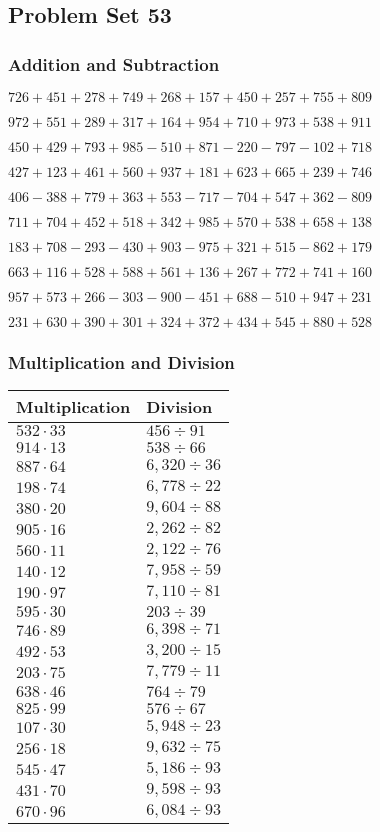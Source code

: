 \hypertarget{problem-set-53-1}{%
\subsection{Problem Set 53}\label{problem-set-53-1}}

\hypertarget{addition-and-subtraction-153}{%
\subsubsection{Addition and
Subtraction}\label{addition-and-subtraction-153}}

\(726 + 451 + 278 + 749 + 268 + 157 + 450 + 257 + 755 + 809\)

\(972 + 551 + 289 + 317 + 164 + 954 + 710 + 973 + 538 + 911\)

\(450 + 429 + 793 + 985 - 510 + 871 - 220 - 797 - 102 + 718\)

\(427 + 123 + 461 + 560 + 937 + 181 + 623 + 665 + 239 + 746\)

\(406 - 388 + 779 + 363 + 553 - 717 - 704 + 547 + 362 - 809\)

\(711 + 704 + 452 + 518 + 342 + 985 + 570 + 538 + 658 + 138\)

\(183 + 708 - 293 - 430 + 903 - 975 + 321 + 515 - 862 + 179\)

\(663 + 116 + 528 + 588 + 561 + 136 + 267 + 772 + 741 + 160\)

\(957 + 573 + 266 - 303 - 900 - 451 + 688 - 510 + 947 + 231\)

\(231 + 630 + 390 + 301 + 324 + 372 + 434 + 545 + 880 + 528\)

\hypertarget{multiplication-and-division-153}{%
\subsubsection{Multiplication and
Division}\label{multiplication-and-division-153}}

\begin{longtable}[]{@{}ll@{}}
\toprule
Multiplication & Division\tabularnewline
\midrule
\endhead
\(532 \cdot 33\) & \(456÷91\)\tabularnewline
\(914 \cdot 13\) & \(538÷66\)\tabularnewline
\(887 \cdot 64\) & \(6,320÷36\)\tabularnewline
\(198 \cdot 74\) & \(6,778÷22\)\tabularnewline
\(380 \cdot 20\) & \(9,604÷88\)\tabularnewline
\(905 \cdot 16\) & \(2,262÷82\)\tabularnewline
\(560 \cdot 11\) & \(2,122÷76\)\tabularnewline
\(140 \cdot 12\) & \(7,958÷59\)\tabularnewline
\(190 \cdot 97\) & \(7,110÷81\)\tabularnewline
\(595 \cdot 30\) & \(203÷39\)\tabularnewline
\(746 \cdot 89\) & \(6,398÷71\)\tabularnewline
\(492 \cdot 53\) & \(3,200÷15\)\tabularnewline
\(203 \cdot 75\) & \(7,779÷11\)\tabularnewline
\(638 \cdot 46\) & \(764÷79\)\tabularnewline
\(825 \cdot 99\) & \(576÷67\)\tabularnewline
\(107 \cdot 30\) & \(5,948÷23\)\tabularnewline
\(256 \cdot 18\) & \(9,632÷75\)\tabularnewline
\(545 \cdot 47\) & \(5,186÷93\)\tabularnewline
\(431 \cdot 70\) & \(9,598÷93\)\tabularnewline
\(670 \cdot 96\) & \(6,084÷93\)\tabularnewline
\bottomrule
\end{longtable}

